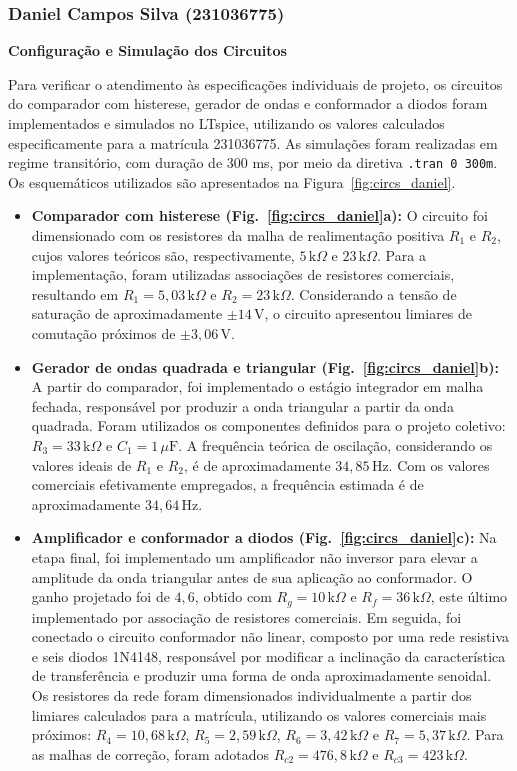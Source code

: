\documentclass[11pt,a4paper]{article}
\begin{document}
\subsubsection{Daniel Campos Silva (231036775)}

\textbf{Configuração e Simulação dos Circuitos}

Para verificar o atendimento às especificações individuais de projeto, os circuitos do comparador com histerese, gerador de ondas e conformador a diodos foram implementados e simulados no LTspice, utilizando os valores calculados especificamente para a matrícula 231036775. As simulações foram realizadas em regime transitório, com duração de 300 ms, por meio da diretiva \texttt{.tran 0 300m}. Os esquemáticos utilizados são apresentados na Figura~\ref{fig:circs_daniel}.

\begin{itemize}
    \item \textbf{Comparador com histerese (Fig.~\ref{fig:circs_daniel}a):} O circuito foi dimensionado com os resistores da malha de realimentação positiva $R_1$ e $R_2$, cujos valores teóricos são, respectivamente, $5\,\text{k}\Omega$ e $23\,\text{k}\Omega$. Para a implementação, foram utilizadas associações de resistores comerciais, resultando em $R_1=5{,}03\,\text{k}\Omega$ e $R_2=23\,\text{k}\Omega$. Considerando a tensão de saturação de aproximadamente $\pm14\,\text{V}$, o circuito apresentou limiares de comutação próximos de $\pm3{,}06\,\text{V}$.

    \item \textbf{Gerador de ondas quadrada e triangular (Fig.~\ref{fig:circs_daniel}b):} A partir do comparador, foi implementado o estágio integrador em malha fechada, responsável por produzir a onda triangular a partir da onda quadrada. Foram utilizados os componentes definidos para o projeto coletivo: $R_3=33\,\text{k}\Omega$ e $C_1=1\,\mu\text{F}$. A frequência teórica de oscilação, considerando os valores ideais de $R_1$ e $R_2$, é de aproximadamente $34{,}85\,\text{Hz}$. Com os valores comerciais efetivamente empregados, a frequência estimada é de aproximadamente $34{,}64\,\text{Hz}$.

    \item \textbf{Amplificador e conformador a diodos (Fig.~\ref{fig:circs_daniel}c):} Na etapa final, foi implementado um amplificador não inversor para elevar a amplitude da onda triangular antes de sua aplicação ao conformador. O ganho projetado foi de $4{,}6$, obtido com $R_g=10\,\text{k}\Omega$ e $R_f=36\,\text{k}\Omega$, este último implementado por associação de resistores comerciais. Em seguida, foi conectado o circuito conformador não linear, composto por uma rede resistiva e seis diodos 1N4148, responsável por modificar a inclinação da característica de transferência e produzir uma forma de onda aproximadamente senoidal. Os resistores da rede foram dimensionados individualmente a partir dos limiares calculados para a matrícula, utilizando os valores comerciais mais próximos: $R_4=10{,}68\,\text{k}\Omega$, $R_5=2{,}59\,\text{k}\Omega$, $R_6=3{,}42\,\text{k}\Omega$ e $R_7=5{,}37\,\text{k}\Omega$. Para as malhas de correção, foram adotados $R_{c2}=476{,}8\,\text{k}\Omega$ e $R_{c3}=423\,\text{k}\Omega$.
\end{itemize}
\end{document}
